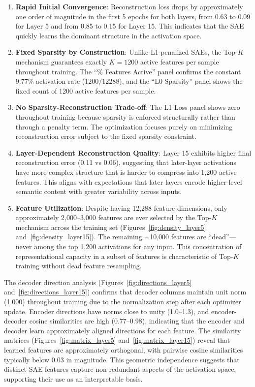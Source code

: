 \documentclass{article}
\begin{document}
\begin{enumerate}
    \item \textbf{Rapid Initial Convergence}: Reconstruction loss drops by approximately one order of magnitude in the first 5 epochs for both layers, from 0.63 to 0.09 for Layer 5 and from 0.85 to 0.15 for Layer 15. This indicates that the SAE quickly learns the dominant structure in the activation space.
    
    \item \textbf{Fixed Sparsity by Construction}: Unlike L1-penalized SAEs, the Top-$K$ mechanism guarantees exactly $K=1200$ active features per sample throughout training. The ``\% Features Active'' panel confirms the constant 9.77\% activation rate ($1200/12288$), and the ``L0 Sparsity'' panel shows the fixed count of 1200 active features per sample.
    
    \item \textbf{No Sparsity-Reconstruction Trade-off}: The L1 Loss panel shows zero throughout training because sparsity is enforced structurally rather than through a penalty term. The optimization focuses purely on minimizing reconstruction error subject to the fixed sparsity constraint.
    
    \item \textbf{Layer-Dependent Reconstruction Quality}: Layer 15 exhibits higher final reconstruction error (0.11 vs 0.06), suggesting that later-layer activations have more complex structure that is harder to compress into 1,200 active features. This aligns with expectations that later layers encode higher-level semantic content with greater variability across inputs.
    
    \item \textbf{Feature Utilization}: Despite having 12,288 feature dimensions, only approximately 2,000--3,000 features are ever selected by the Top-$K$ mechanism across the training set (Figures~\ref{fig:density_layer5} and~\ref{fig:density_layer15}). The remaining $\sim$10,000 features are ``dead''---never among the top 1,200 activations for any input. This concentration of representational capacity in a subset of features is characteristic of Top-$K$ training without dead feature resampling.
\end{enumerate}

The decoder direction analysis (Figures~\ref{fig:directions_layer5} and~\ref{fig:directions_layer15}) confirms that decoder columns maintain unit norm (1.000) throughout training due to the normalization step after each optimizer update. Encoder directions have norms close to unity (1.0--1.3), and encoder-decoder cosine similarities are high (0.77--0.98), indicating that the encoder and decoder learn approximately aligned directions for each feature. The similarity matrices (Figures~\ref{fig:matrix_layer5} and~\ref{fig:matrix_layer15}) reveal that learned features are approximately orthogonal, with pairwise cosine similarities typically below 0.03 in magnitude. This geometric independence suggests that distinct SAE features capture non-redundant aspects of the activation space, supporting their use as an interpretable basis.
\end{document}
